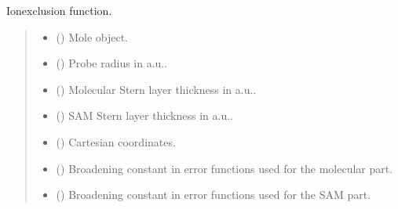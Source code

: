 \documentclass[letterpaper,10pt,english]{sphinxmanual}
\begin{document}
\begin{fulllineitems}
\label{\detokenize{fcdft.solvent:fcdft.solvent.pbe.make_lambda}}
\pysigstartsignatures
\pysiglinewithargsret
{}
{\sphinxparamcomma {}\sphinxparamcomma {}\sphinxparamcomma {}\sphinxparamcomma {}\sphinxparamcomma {}\sphinxparamcomma {}\sphinxparamcomma {}\sphinxparamcomma {}}
{}
\pysigstopsignatures
\sphinxAtStartPar
Ion\sphinxhyphen{}exclusion function.
\begin{quote}\begin{description}
\begin{itemize}
\item {} 
\sphinxAtStartPar
{} () \textendash{} Mole object.

\item {} 
\sphinxAtStartPar
{} () \textendash{} Probe radius in a.u..

\item {} 
\sphinxAtStartPar
{} () \textendash{} Molecular Stern layer thickness in a.u..

\item {} 
\sphinxAtStartPar
{} () \textendash{} SAM Stern layer thickness in a.u..

\item {} 
\sphinxAtStartPar
{} () \textendash{} Cartesian coordinates.

\item {} 
\sphinxAtStartPar
{} () \textendash{} Broadening constant in error functions used for the molecular part.

\item {} 
\sphinxAtStartPar
{} () \textendash{} Broadening constant in error functions used for the SAM part.


\end{itemize}
\end{description}
\end{quote}
\end{fulllineitems}
\end{document}
